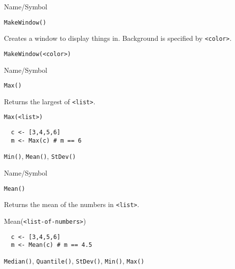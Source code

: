 \begin{desc}{Name/Symbol}
\item[Name/Symbol]	\verb+MakeWindow()+ 

\item[Description]	Creates a window to display things in.
		Background is specified by \verb+<color>+.

\item[Usage]		
\begin{verbatim}
MakeWindow(<color>)
\end{verbatim}

\item[Example]	

\item[See Also]	
\end{desc}

\begin{desc}{Name/Symbol}
\item[Name/Symbol]	\verb+Max()+            

\item[Description] Returns the largest of \verb+<list>+.

\item[Usage]		
\begin{verbatim}
Max(<list>)
\end{verbatim}

\item[Example]	
\begin{verbatim} 
  c <- [3,4,5,6]
  m <- Max(c) # m == 6
\end{verbatim}

\item[See Also]	\verb+Min()+, \verb+Mean()+, \verb+StDev()+
\end{desc}




\begin{desc}{Name/Symbol}
\item[Name/Symbol]	\verb+Mean()+

\item[Description] 	Returns the mean of the numbers in \verb+<list>+.

\item[Usage]	Mean(\verb+<list-of-numbers>+)	

\item[Example]	
\begin{verbatim} 
  c <- [3,4,5,6]
  m <- Mean(c) # m == 4.5
\end{verbatim}

\item[See Also]	\verb+Median()+, \verb+Quantile()+, \verb+StDev()+, \verb+Min()+, \verb+Max()+
\end{desc}


